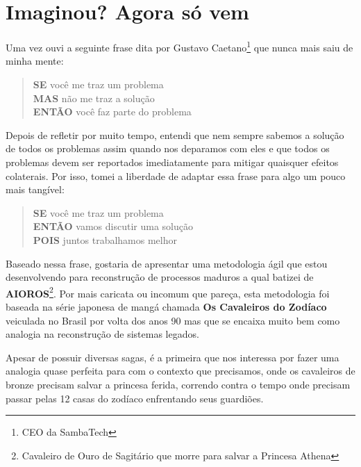 
\section{Imaginou? Agora só vem}

Uma vez ouvi a seguinte frase dita por Gustavo Caetano\footnote{CEO da SambaTech} que nunca mais saiu de minha mente:
\begin{quote}
    \textbf{SE} você me traz um problema \\
    \textbf{MAS} não me traz a solução \\
    \textbf{ENTÃO} você faz parte do problema
\end{quote}

Depois de refletir por muito tempo, entendi que nem sempre sabemos a solução de todos os problemas assim quando nos deparamos com eles e que todos os problemas devem ser reportados imediatamente para mitigar quaisquer efeitos colaterais. Por isso, tomei a liberdade de adaptar essa frase para algo um pouco mais tangível:
\begin{quote}
    \textbf{SE} você me traz um problema \\
    \textbf{ENTÃO} vamos discutir uma solução \\
    \textbf{POIS} juntos trabalhamos melhor
\end{quote}

Baseado nessa frase, gostaria de apresentar uma metodologia ágil que estou desenvolvendo para reconstrução de processos maduros a qual batizei de \textbf{AIOROS}\footnote{Cavaleiro de Ouro de Sagitário que morre para salvar a Princesa Athena}. Por mais caricata ou incomum que pareça, esta metodologia foi baseada na série japonesa de mangá chamada \textbf{Os Cavaleiros do Zodíaco} veiculada no Brasil por volta dos anos 90 mas que se encaixa muito bem como analogia na reconstrução de sistemas legados.

Apesar de possuir diversas sagas, é a primeira que nos interessa por fazer uma analogia quase perfeita para com o contexto que precisamos, onde os cavaleiros de bronze precisam salvar a princesa ferida, correndo contra o tempo onde precisam passar pelas 12 casas do zodíaco enfrentando seus guardiões.

